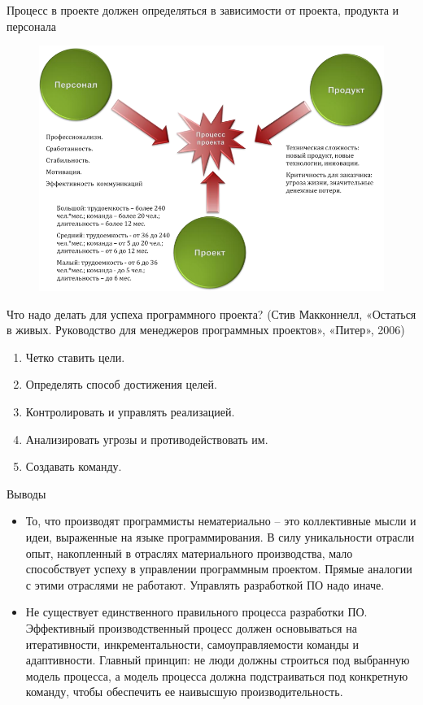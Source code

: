 \documentclass{beamer}
\begin{document}
\begin{frame}
Процесс в проекте должен определяться в зависимости от проекта, продукта и персонала
\begin{figure}[h]
\centering
\includegraphics[scale=0.5]{images/lec01-pic04.png}
\label{pic-sort}
\end{figure}
\end{frame}

\begin{frame}
Что надо делать для успеха программного проекта? (Стив Макконнелл, «Остаться в живых. Руководство для менеджеров
программных проектов», «Питер», 2006)
\begin{enumerate}
\item Четко ставить цели.
\item Определять способ достижения целей.
\item Контролировать и управлять реализацией.
\item Анализировать угрозы и противодействовать им.
\item Создавать команду.
\end{enumerate}
\end{frame}

\begin{frame}
Выводы
\begin{itemize}
\item То, что производят программисты нематериально – это коллективные мысли и
идеи, выраженные на языке программирования. В силу уникальности отрасли
опыт, накопленный в отраслях материального производства, мало способствует
успеху в управлении программным проектом. Прямые аналогии с этими
отраслями не работают. Управлять разработкой ПО надо иначе.
\item Не существует единственного правильного процесса разработки ПО.
Эффективный производственный процесс должен основываться на
итеративности, инкрементальности, самоуправляемости команды и
адаптивности. Главный принцип: не люди должны строиться под выбранную
модель процесса, а модель процесса должна подстраиваться под конкретную
команду, чтобы обеспечить ее наивысшую производительность.
\end{itemize}
\end{frame}
\end{document}
